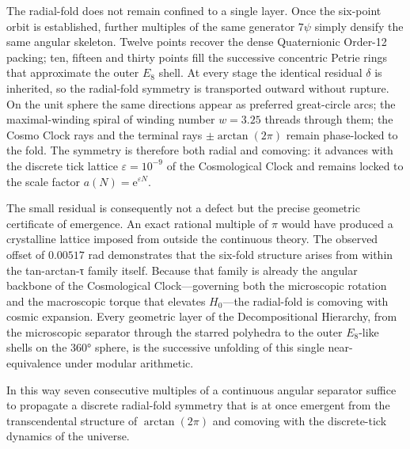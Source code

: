 The radial-fold does not remain confined to a single layer. Once the six-point orbit is established, further multiples of the same generator \(7\psi\) simply densify the same angular skeleton. Twelve points recover the dense Quaternionic Order-12 packing; ten, fifteen and thirty points fill the successive concentric Petrie rings that approximate the outer \(E_8\) shell. At every stage the identical residual \(\delta\) is inherited, so the radial-fold symmetry is transported outward without rupture. On the unit sphere the same directions appear as preferred great-circle arcs; the maximal-winding spiral of winding number \(w=3.25\) threads through them; the Cosmo Clock rays and the terminal rays \(\pm\arctan(2\pi)\) remain phase-locked to the fold. The symmetry is therefore both radial and comoving: it advances with the discrete tick lattice \(\varepsilon=10^{-9}\) of the Cosmological Clock and remains locked to the scale factor \(a(N)=\mathrm{e}^{\varepsilon N}\).

The small residual is consequently not a defect but the precise geometric certificate of emergence. An exact rational multiple of \(\pi\) would have produced a crystalline lattice imposed from outside the continuous theory. The observed offset of \(0.00517\) rad demonstrates that the six-fold structure arises from within the tan-arctan-τ family itself. Because that family is already the angular backbone of the Cosmological Clock—governing both the microscopic rotation and the macroscopic torque that elevates \(H_0\)—the radial-fold is comoving with cosmic expansion. Every geometric layer of the Decompositional Hierarchy, from the microscopic separator through the starred polyhedra to the outer \(E_8\)-like shells on the 360° sphere, is the successive unfolding of this single near-equivalence under modular arithmetic.

In this way seven consecutive multiples of a continuous angular separator suffice to propagate a discrete radial-fold symmetry that is at once emergent from the transcendental structure of \(\arctan(2\pi)\) and comoving with the discrete-tick dynamics of the universe.
